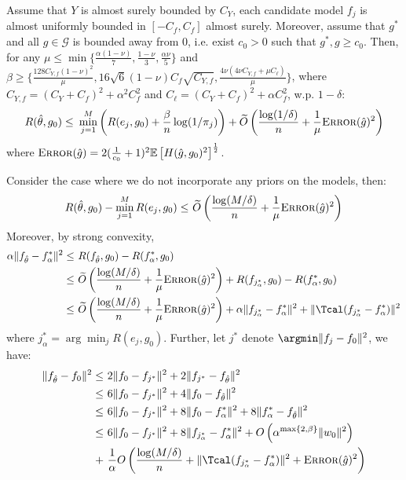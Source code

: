 \documentclass[12pt]{extarticle} %
\newcommand{\error}{\ensuremath{\textsc{Error}}}
\begin{document}
\begin{theorem}\label{thm:q_agg}
Assume that $Y$ is almost surely bounded by $C_Y$, each candidate model $f_j$ is almost uniformly bounded in $[-C_f,C_f]$ almost surely. Moreover, assume that $g^*$ and all $g\in \mathcal{G}$ is bounded away from 0, i.e. exist $c_0>0$ such that $g^*, g\geq c_0$. Then, for any $\mu \leq \min\{\frac{\alpha(1-\nu)}{7}, \frac{1-\nu}{3}, \frac{\alpha\nu}{5}\}$  and $\beta \geq \{ \frac{128C_{Y,f}(1-\nu)^2}{\mu}, 16\sqrt{6}(1-\nu)C_f \sqrt{C_{Y,f}},\frac{4\nu(4\nu C_{Y,f} + \mu C_{\ell})}{\mu}\}$, where $C_{Y,f} = (C_Y+C_f)^2+\alpha^2 C_f^2$ and $C_{\ell} = (C_Y+C_f)^2+\alpha C_f^2$, w.p. $1-\delta$:
\begin{align*}
    R(\hat{\theta}, g_0) \leq~& \min_{j=1}^M\left( R(e_j, g_0)  +\frac{\beta}{n}\log(1/\pi_j)\right) + \widetilde{O}\left(  \frac{\log(1/\delta)}{n} + \frac{1}{\mu}\error(\hat{g})^{2}\right) \\
\end{align*} where $\error(\hat{g}) =2(\frac{1}{c_0} + 1)^2\mathbb{E}\left[H(\hat{g},g_0)^2\right]^{\frac{1}{2}}$.
\end{theorem}
Consider the case where we do not incorporate any priors on the models, then:
\begin{align*}
    R(\hat{\theta}, g_0) -\min_{j=1}^M R(e_j, g_0)\leq~& \widetilde{O}\left(\frac{\log(M/\delta)}{n} + \frac{1}{\mu}\error(\hat{g})^{2}\right)\\
\end{align*}
Moreover, by strong convexity,
\begin{align*}
    \alpha\|f_{\hat{\theta}} - f_{\alpha}^*\|^2 \leq~&  R(f_{\hat{\theta}}, g_0)  -  R(f_{\alpha}^*, g_0)\\
    \leq ~& \widetilde{O}\left(\frac{\log(M/\delta)}{n} + \frac{1}{\mu}\error(\hat{g})^{2}\right) + R(f_{j_{\alpha}^*}, g_0)  -  R(f_{\alpha}^*, g_0)\\
    \leq ~& \widetilde{O}\left(\frac{\log(M/\delta)}{n} + \frac{1}{\mu}\error(\hat{g})^{2}\right) + \alpha \|f_{j_{\alpha}^*}-f_{\alpha}^*\|^2 +\|\Tcal (f_{j_{\alpha}^*}-f_{\alpha}^*)\|^2
\end{align*} where $j^*_{\alpha} = \arg\min_j R(e_j,g_0)$.
Further, let $j^*$ denote $\argmin \|f_j-f_0\|^2$, we have:
\begin{align*}
    \|f_{\hat{\theta}}-f_0\|^2 \leq~&  2\|f_0 - f_{j^*}\|^2 + 2\|f_{j^*}-f_{\hat{\theta}}\|^2\\
    \leq~& 6\|f_0 - f_{j^*}\|^2 + 4 \|f_0-f_{\hat{\theta}}\|^2\\
    \leq~& 6\|f_0 - f_{j^*}\|^2  + 8 \|f_0-f_{\alpha}^*\|^2 + 8\|f_{\alpha}^*-f_{\hat{\theta}}\|^2\\
    \leq ~& 6\|f_0 - f_{j^*}\|^2 + 8\|f_{j_{\alpha}^*} - f_{\alpha}^*\|^2 + O\left(\alpha^{\max\{2, \beta\}}\|w_0\|^2\right) \\
    +~&\frac{1}{\alpha} O\left(\frac{\log(M/\delta)}{n} + \|\Tcal (f_{j_{\alpha}^*} - f_{\alpha}^*)\|^2 + \error(\hat{g})^2\right)\\
\end{align*}
\end{document}
